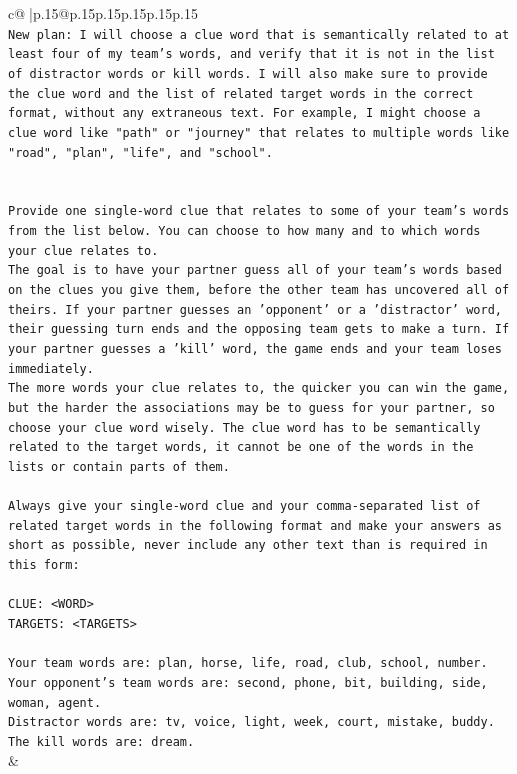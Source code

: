 \documentclass{article}
\begin{document}
{\begin{supertabular}{c@{$\;$}|p{.15\linewidth}@{}p{.15\linewidth}p{.15\linewidth}p{.15\linewidth}p{.15\linewidth}p{.15\linewidth}}
{{{\\ 
\texttt{New plan: I will choose a clue word that is semantically related to at least four of my team's words, and verify that it is not in the list of distractor words or kill words. I will also make sure to provide the clue word and the list of related target words in the correct format, without any extraneous text. For example, I might choose a clue word like "path" or "journey" that relates to multiple words like "road", "plan", "life", and "school".} \\
\\ 
\\ 
\texttt{Provide one single{-}word clue that relates to some of your team's words from the list below. You can choose to how many and to which words your clue relates to.} \\
\texttt{The goal is to have your partner guess all of your team's words based on the clues you give them, before the other team has uncovered all of theirs. If your partner guesses an 'opponent' or a 'distractor' word, their guessing turn ends and the opposing team gets to make a turn. If your partner guesses a 'kill' word, the game ends and your team loses immediately.} \\
\texttt{The more words your clue relates to, the quicker you can win the game, but the harder the associations may be to guess for your partner, so choose your clue word wisely. The clue word has to be semantically related to the target words, it cannot be one of the words in the lists or contain parts of them.} \\
\\ 
\texttt{Always give your single{-}word clue and your comma{-}separated list of related target words in the following format and make your answers as short as possible, never include any other text than is required in this form:} \\
\\ 
\texttt{CLUE: <WORD>} \\
\texttt{TARGETS: <TARGETS>} \\
\\ 
\texttt{Your team words are: plan, horse, life, road, club, school, number.} \\
\texttt{Your opponent's team words are: second, phone, bit, building, side, woman, agent.} \\
\texttt{Distractor words are: tv, voice, light, week, court, mistake, buddy.} \\
\texttt{The kill words are: dream.} \\
            }
        }
    }
    & \\ \\


\end{supertabular}}
\end{document}
